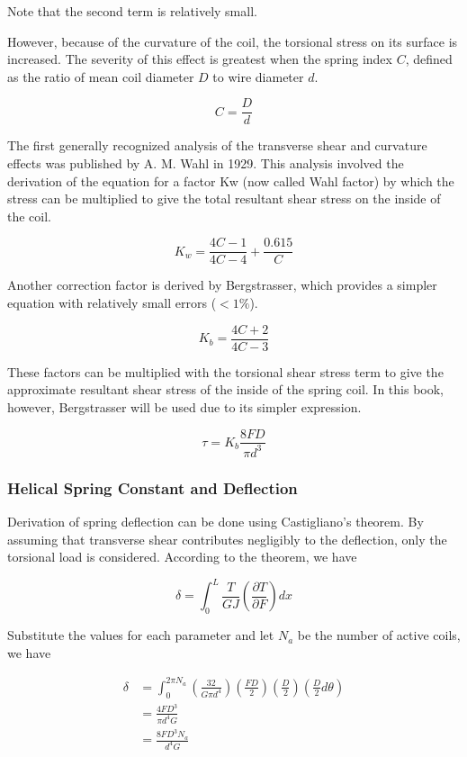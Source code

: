 \documentclass[a4paper,openany,nobib]{tufte-book}
\begin{document}
{{Note that the second term is relatively small.

However, because of the curvature of the coil, the torsional stress on
its surface is increased. The severity of this effect is greatest when
the spring index \(C\), defined as the ratio of mean coil diameter \(D\) to
wire diameter \(d\).

$$C = \frac{D}{d}$$

The first generally recognized analysis of the transverse shear and
curvature effects was published by A. M. Wahl in 1929. This analysis
involved the derivation of the equation for a factor Kw (now called Wahl
factor) by which the stress can be multiplied to give the total
resultant shear stress on the inside of the coil.

$$K_w = \frac{4C - 1}{4C - 4} + \frac{0.615}{C}$$

Another correction factor is derived by Bergstrasser, which provides a
simpler equation with relatively small errors (\(< 1\%\)).

$$K_b = \frac{4C + 2}{4C - 3}$$

These factors can be multiplied with the torsional shear stress term to
give the approximate resultant shear stress of the inside of the spring
coil. In this book, however, Bergstrasser will be used due to its
simpler expression.

$$\tau  = K_b\frac{8FD}{\pi d^3}$$

\subsubsection{Helical Spring Constant and Deflection}
\label{helical-spring-constant-and-deflection}
Derivation of spring deflection can be done using Castigliano's theorem.
By assuming that transverse shear contributes negligibly to the
deflection, only the torsional load is considered. According to the
theorem, we have

$$\delta  = \int_0^L \frac{T}{GJ}\left( \frac{\partial T}{\partial F} \right)dx$$

Substitute the values for each parameter and let \(N_a\) be the number of
active coils, we have

$$\begin{aligned}
  \delta  &= \int_0^{2\pi N_a} \left( \frac{32}{G\pi d^4} \right)\left( \frac{FD}{2} \right)\left( \frac{D}{2} \right)\left( \frac{D}{2}d\theta  \right) \\ 
          &= \frac{4FD^3}{\pi d^4G} \\ 
          &= \frac{8FD^3N_a}{d^4G}\end{aligned}$$

}}
\end{document}
